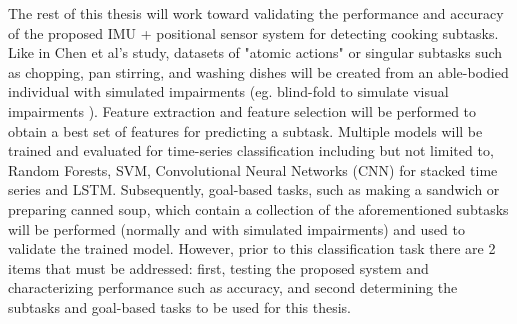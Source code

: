 The rest of this thesis will work toward validating the performance and accuracy of the proposed IMU + positional sensor system for detecting cooking subtasks. Like in Chen et al's study, datasets of "atomic actions" or singular subtasks such as chopping, pan stirring, and washing dishes \cite{chen_measuring_2021} will be created from an able-bodied individual with simulated impairments (eg. blind-fold to simulate visual impairments \cite{leo_negotiated_2014}). Feature extraction and feature selection will be performed to obtain a best set of features for predicting a subtask. Multiple models will be trained and evaluated for time-series classification including but not limited to, Random Forests, SVM, Convolutional Neural Networks (CNN) for stacked time series and LSTM. Subsequently, goal-based tasks, such as making a sandwich or preparing canned soup, which contain a collection of the aforementioned subtasks will be performed (normally and with simulated impairments) and used to validate the trained model. However, prior to this classification task there are 2 items that must be addressed: first, testing the proposed system and characterizing performance such as accuracy, and second determining the subtasks and goal-based tasks to be used for this thesis.